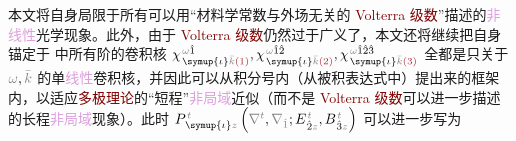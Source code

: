 本文将自身局限于所有可以用“材料学常数与外场无关的 \textcolor{Maroon}{Volterra 级数}\cite{pintoExactVolterraseriesComputation1982,shenNonlinearOpticalSusceptibilities2001}”描述的\textcolor{Plum}{非线性}光学现象。此外，由于 \textcolor{Maroon}{Volterra 级数}仍然过于广义了，本文还将继续把自身锚定于  中所有阶的卷积核 $\chi^{\;\! \mathcolor{gray}{\omega} \hat{1}}_{\;\! \symup{\iota} \mathcolor{gray}{\bar{k}} \textcolor{Maroon}{(1)}}, \chi^{\;\! \mathcolor{gray}{\omega} \hat{1} \hat{2}}_{\;\! \symup{\iota} \mathcolor{gray}{\bar{k}} \textcolor{Maroon}{(2)}}, \chi^{\;\! \mathcolor{gray}{\omega} \hat{1} \hat{2} \hat{3}}_{\;\! \symup{\iota} \mathcolor{gray}{\bar{k}} \textcolor{Maroon}{(3)}}$ 全都是只关于 $\mathcolor{gray}{\omega}, \mathcolor{gray}{\bar{k}}$ 的单\textcolor{Plum}{线性}卷积核，并因此可以从积分号内（从被积表达式中）提出来的框架内，以适应\textcolor{Maroon}{多极理论}的“短程”\textcolor{Plum}{非局域}近似（而不是 \textcolor{Maroon}{Volterra 级数}可以进一步描述的长程\textcolor{Plum}{非局域}现象）。此时 $P^{\;\!\mathcolor{gray}{t}}_{\;\! \symup{\iota}\mathcolor{gray}{z}} \left( \mathcolor{gray}{\nabla^t}, \mathcolor{gray}{\nabla_{\hat{1}}} ; E^{\;\!\mathcolor{gray}{t}}_{\;\! \hat{2}\mathcolor{gray}{z}}, B^{\;\!\mathcolor{gray}{t}}_{\;\! \hat{3}\mathcolor{gray}{z}} \right)$ 可以进一步写为\cite{teixeiraOpticalTransmissionModeling2013,andreasczylwikNonlinearSystemModeling1986,shenNonlinearOpticalSusceptibilities2001,zalevskyOpticalImplementationSecondorder2001,zhangNonlinearQuantumInputoutput2014}
